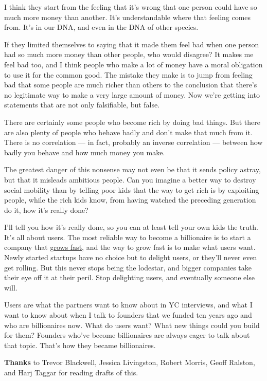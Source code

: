 \documentclass[12pt]{book}
\begin{document}
I think they start from the feeling that it's wrong that one person
could have so much more money than another. It's understandable where
that feeling comes from. It's in our DNA, and even in the DNA of other
species.

If they limited themselves to saying that it made them feel bad when one
person had so much more money than other people, who would disagree? It
makes me feel bad too, and I think people who make a lot of money have a
moral obligation to use it for the common good. The mistake they make is
to jump from feeling bad that some people are much richer than others to
the conclusion that there's no legitimate way to make a very large
amount of money. Now we're getting into statements that are not only
falsifiable, but false.

There are certainly some people who become rich by doing bad things. But
there are also plenty of people who behave badly and don't make that
much from it. There is no correlation --- in fact, probably an inverse
correlation --- between how badly you behave and how much money you
make.

The greatest danger of this nonsense may not even be that it sends
policy astray, but that it misleads ambitious people. Can you imagine a
better way to destroy social mobility than by telling poor kids that the
way to get rich is by exploiting people, while the rich kids know, from
having watched the preceding generation do it, how it's really done?

I'll tell you how it's really done, so you can at least tell your own
kids the truth. It's all about users. The most reliable way to become a
billionaire is to start a company that \href{growth.html}{grows fast},
and the way to grow fast is to make what users want. Newly started
startups have no choice but to delight users, or they'll never even get
rolling. But this never stops being the lodestar, and bigger companies
take their eye off it at their peril. Stop delighting users, and
eventually someone else will.

Users are what the partners want to know about in YC interviews, and
what I want to know about when I talk to founders that we funded ten
years ago and who are billionaires now. What do users want? What new
things could you build for them? Founders who've become billionaires are
always eager to talk about that topic. That's how they became
billionaires.


\textbf{Thanks} to Trevor Blackwell, Jessica Livingston, Robert Morris,
Geoff Ralston, and Harj Taggar for reading drafts of this.
\end{document}
